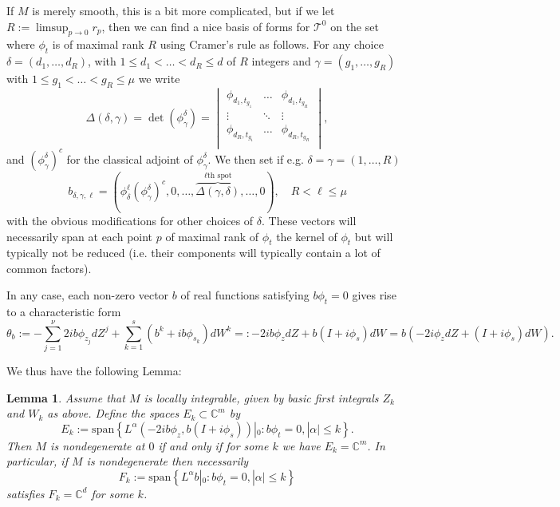 \documentclass[11pt]{amsart}
\newcommand{\C}{\mathbb{C}}
\newcommand{\charsheaf}{\mathcal{T}^0}
\theoremstyle{definition}
\theoremstyle{remark}
\theoremstyle{plain}
\newtheorem{lem}[defn]{Lemma}
\begin{document}
If $M$ is merely smooth, this is a bit more complicated, but if we let
$R := \limsup_{p\to 0} r_p$, then we can find a nice
basis of forms for $\charsheaf$ on the set where $\phi_t$ is of maximal rank $R$
using Cramer's rule as follows. For any choice $\delta = (d_1,\dots,d_R)$, with  $1\leq d_1 < \dots < d_R\leq d $  of $R$ integers and  $\gamma = (g_1, \dots ,g_R)$ with $1\leq g_1 < \dots < g_R \leq \mu$ we write 
\[
\Delta ( \delta, \gamma) = \det( \phi^\delta_{\gamma} ) = 
  \begin{vmatrix}
    \phi_{d_1,t_{g_1}} & \dots & \phi_{d_1,t_{g_R}} \\
    \vdots & \ddots & \vdots \\
\phi_{d_R,t_{g_1}} & \dots & \phi_{d_R,t_{g_R}} \\
  \end{vmatrix}
  , 
\]
and $(\phi^\delta_\gamma)^c$ for the classical adjoint of $\phi^\delta_\gamma $. We
then set if e.g. $\delta = \gamma = (1,\dots, R)$
\[b_{\delta,\gamma,\ell} = (\phi^{\ell}_\delta (\phi^\delta_\gamma)^c, 0, \dots, \overbrace{\Delta(\gamma,\delta)}^{{\ell}\text{th spot}}, \dots, 0), \quad R < \ell \leq \mu\]
with the obvious modifications for other choices of $\delta$. These vectors will necessarily span at each point $p$
of maximal rank of $\phi_t$ the kernel of $\phi_t$ but will typically not be reduced
(i.e. their components will typically contain a lot of common factors). 

In any case, each non-zero vector $b$ of real functions satisfying $b\phi_t= 0$ gives rise to a characteristic form
\[ \theta_b := -\sum_{j=1 }^\nu 2i b \phi_{z_j} dZ^j + \sum_{k=1}^s (b^k + i b \phi_{s_k} ) dW^k =:- 2i b \phi_z dZ + b(I+ i \phi_s) dW = b \left(-2i \phi_z dZ + (I+i\phi_s) dW\right).  \]

We thus have the following Lemma:

\begin{lem}
  Assume that $M$ is locally integrable, given by basic first integrals $Z_k$ and $W_k$ as above. Define the
  spaces $E_k\subset \C^{m} $ by
  \[ E_k := \mathrm{span} \left\{ L^\alpha (-2ib \phi_z, b(I + i \phi_s))|_0 \colon b\phi_t = 0, |\alpha| \leq k    \right\}. \]
  Then $M$ is nondegenerate at $0$ if and only if for some $k$ we have $E_k = \C^m$. 
  In particular, if $M$ is nondegenerate then necessarily
  \[F_k :=\mathrm{span} \left\{ L^\alpha b|_0 \colon b\phi_t = 0, |\alpha| \leq k    \right\}  \]
  satisfies $F_k = \C^d$ for some $k$. 
\end{lem}
\end{document}
